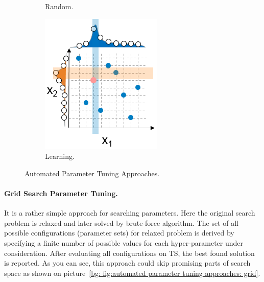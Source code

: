 \begin{figure}
\begin{subfigure}[b]{0.25\linewidth}
		\caption{Random.}
		\label{bg: fig:automated parameter tuning approaches: random}
	\end{subfigure}
	\begin{subfigure}[b]{0.25\linewidth}
		\includegraphics[width=\linewidth]{graphics/Background/hyperparameter-learning-search.png}
		\caption{Learning.}
		\label{bg: fig:automated parameter tuning approaches: learning}
	\end{subfigure}
	\caption{Automated Parameter Tuning Approaches.}
	\label{bg: fig:automated parameter tuning approaches}
\end{figure}

\paragraph{Grid Search Parameter Tuning.} It is a rather simple approach for searching parameters. Here the original search problem is relaxed and later solved by brute-force algorithm. The set of all possible configurations (parameter sets) for relaxed problem is derived by specifying a finite number of possible values for each hyper-parameter under consideration. After evaluating all configurations on TS, the best found solution is reported. As you can see, this approach could skip promising parts of search space as shown on picture~\ref{bg: fig:automated parameter tuning approaches: grid}.

